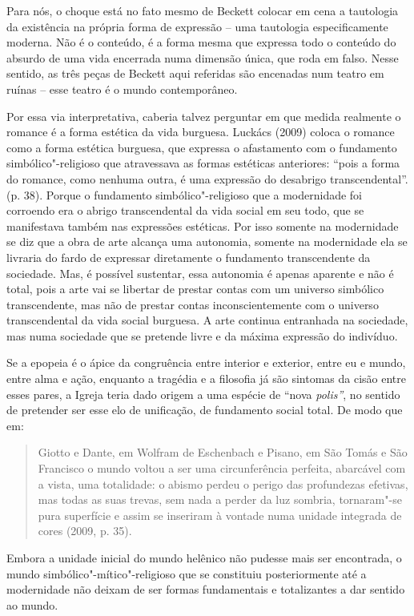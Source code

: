 {Para nós, o choque está no fato mesmo de Beckett colocar em cena a
tautologia da existência na própria forma de expressão -- uma tautologia
especificamente moderna. Não é o conteúdo, é a forma mesma que expressa
todo o conteúdo do absurdo de uma vida encerrada numa dimensão única,
que roda em falso. Nesse sentido, as três peças de Beckett aqui
referidas são encenadas num teatro em ruínas -- esse teatro é o mundo
contemporâneo.

Por essa via interpretativa, caberia talvez perguntar em que medida
realmente o romance é a forma estética da vida burguesa. Luckács (2009)
coloca o romance como a forma estética burguesa, que expressa o
afastamento com o fundamento simbólico"-religioso que atravessava as
formas estéticas anteriores: ``pois a forma do romance, como nenhuma
outra, é uma expressão do desabrigo transcendental''. (p. 38). Porque o
fundamento simbólico"-religioso que a modernidade foi corroendo era o
abrigo transcendental da vida social em seu todo, que se manifestava
também nas expressões estéticas. Por isso somente na modernidade se diz
que a obra de arte alcança uma autonomia, somente na modernidade ela se
livraria do fardo de expressar diretamente o fundamento transcendente da
sociedade. Mas, é possível sustentar, essa autonomia é apenas aparente e
não é total, pois a arte vai se libertar de prestar contas com um
universo simbólico transcendente, mas não de prestar contas
inconscientemente com o universo transcendental da vida social burguesa.
A arte continua entranhada na sociedade, mas numa sociedade que se
pretende livre e da máxima expressão do indivíduo.

Se a epopeia é o ápice da congruência entre interior e exterior, entre
eu e mundo, entre alma e ação, enquanto a tragédia e a filosofia já são
sintomas da cisão entre esses pares, a Igreja teria dado origem a uma
espécie de ``nova \emph{polis''}, no sentido de pretender ser esse elo
de unificação, de fundamento social total. De modo que em:

\begin{quote}
Giotto e Dante, em Wolfram de Eschenbach e Pisano, em São Tomás e São
Francisco o mundo voltou a ser uma circunferência perfeita, abarcável
com a vista, uma totalidade: o abismo perdeu o perigo das profundezas
efetivas, mas todas as suas trevas, sem nada a perder da luz sombria,
tornaram"-se pura superfície e assim se inseriram à vontade numa unidade
integrada de cores (2009, p. 35).
\end{quote}

Embora a unidade inicial do mundo helênico não pudesse mais ser
encontrada, o mundo simbólico"-mítico"-religioso que se constituiu
posteriormente até a modernidade não deixam de ser formas fundamentais e
totalizantes a dar sentido ao mundo.

}
